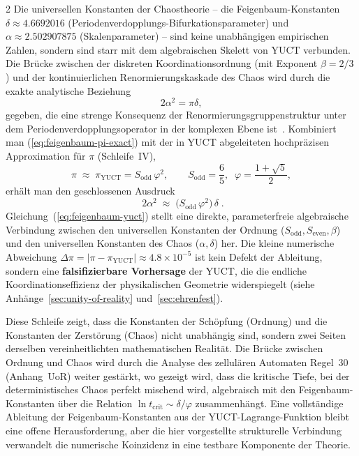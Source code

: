 \documentclass[12pt,a4paper]{article}
\begin{document}
\begin{multicols}{2}
		Die universellen Konstanten der Chaostheorie – die Feigenbaum-Konstanten
		\(\delta \approx 4.6692016\) (Periodenverdopplungs-Bifurkationsparameter) und
		\(\alpha \approx 2.502907875\) (Skalenparameter) – sind keine unabhängigen empirischen Zahlen, sondern sind starr mit dem algebraischen Skelett von YUCT verbunden.
		Die Brücke zwischen der diskreten Koordinationsordnung (mit Exponent \(\beta=2/3\)) und der kontinuierlichen Renormierungskaskade des Chaos wird durch die exakte analytische Beziehung
		\begin{equation}
			2\alpha^2 = \pi \delta,
			\label{eq:feigenbaum-pi-exact}
		\end{equation}
		gegeben, die eine strenge Konsequenz der Renormierungsgruppenstruktur unter dem Periodenverdopplungsoperator in der komplexen Ebene ist~\cite{Feigenbaum1978}.
		Kombiniert man (\ref{eq:feigenbaum-pi-exact}) mit der in YUCT abgeleiteten hochpräzisen Approximation für \(\pi\) (Schleife~IV),
		\begin{equation}
			\pi \;\approx\; \pi_{\mathrm{YUCT}} = S_{\mathrm{odd}}\,\varphi^2,
			\qquad
			S_{\mathrm{odd}} = \frac{6}{5},\;\; \varphi = \frac{1+\sqrt{5}}{2},
		\end{equation}
		erhält man den geschlossenen Ausdruck
		\begin{equation}
			\boxed{\;
				2\alpha^2 \;\approx\; \bigl(S_{\mathrm{odd}}\,\varphi^2\bigr)\,\delta
				\;}.
			\label{eq:feigenbaum-yuct}
		\end{equation}
		Gleichung~(\ref{eq:feigenbaum-yuct}) stellt eine direkte, parameterfreie algebraische Verbindung zwischen den universellen Konstanten der Ordnung (\(S_{\mathrm{odd}}, S_{\mathrm{even}}, \beta\)) und den universellen Konstanten des Chaos (\(\alpha, \delta\)) her. Die kleine numerische Abweichung
		\(\Delta\pi = |\pi - \pi_{\mathrm{YUCT}}| \approx 4.8\times10^{-5}\)
		ist kein Defekt der Ableitung, sondern eine \textbf{falsifizierbare Vorhersage} der YUCT, die die endliche Koordinationseffizienz der physikalischen Geometrie widerspiegelt (siehe Anhänge~\ref{sec:unity-of-reality} und~\ref{sec:ehrenfest}).
		
		Diese Schleife zeigt, dass die Konstanten der Schöpfung (Ordnung) und die Konstanten der Zerstörung (Chaos) nicht unabhängig sind, sondern zwei Seiten derselben vereinheitlichten mathematischen Realität. Die Brücke zwischen Ordnung und Chaos wird durch die Analyse des zellulären Automaten Regel~30 (Anhang~UoR) weiter gestärkt, wo gezeigt wird, dass die kritische Tiefe, bei der deterministisches Chaos perfekt mischend wird, algebraisch mit den Feigenbaum-Konstanten über die Relation \(\ln t_{\mathrm{crit}} \sim \delta/\varphi\) zusammenhängt. Eine vollständige Ableitung der Feigenbaum-Konstanten aus der YUCT-Lagrange-Funktion bleibt eine offene Herausforderung, aber die hier vorgestellte strukturelle Verbindung verwandelt die numerische Koinzidenz in eine testbare Komponente der Theorie.
		

\end{multicols}
\end{document}
